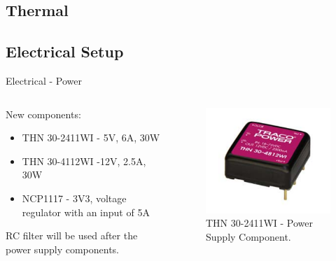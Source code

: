 \documentclass[11pt, aspectratio=169]{beamer}
\begin{document}

\subsection{Thermal}


\subsection{Electrical Setup}

  \begin{frame}[c]{Electrical - Power}
    \begin{columns}[t]
        \begin{column}{.4\textwidth}
            \centering
            New components:
            \begin{itemize}
            	\item THN 30-2411WI - 5V, 6A, 30W\\ 
            	\item THN 30-4112WI -12V, 2.5A, 30W \\ 
            	\item NCP1117 - 3V3, voltage regulator with an input of 5A\\
            \end{itemize}
           
            RC filter will be used after the power supply components. 
        \end{column}
        \begin{column}{.6\textwidth}
        	\centering
        	\vspace{-.5cm}
            \begin{figure}
                \includegraphics[scale=0.3]{component/tracoPowerComp.png}
                \caption{THN 30-2411WI - Power Supply Component.}
            \end{figure}
        \end{column}
    \end{columns}   
   \end{frame}
\end{document}
